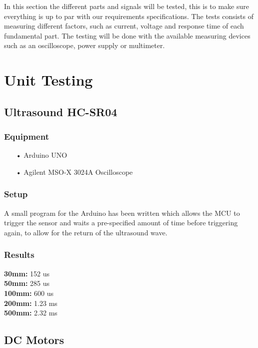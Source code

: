 In this section the different parts and signals will be tested, this is to make sure everything is up to par with our requirements specifications. The tests consists of measuring different factors, such as current, voltage and response time of each fundamental part. The testing will be done with the available measuring devices such as an oscilloscope, power supply or multimeter.


\section{Unit Testing}


\subsection{Ultrasound HC-SR04}


\subsubsection{Equipment}
\begin{enumerate}
    \item[•]Arduino UNO
    \item[•]Agilent MSO-X 3024A Oscilloscope    
\end{enumerate}

\subsubsection{Setup}
A small program for the Arduino has been written which allows the MCU to trigger the sensor and waits a pre-specified amount of time before triggering again, to allow for the return of the ultrasound wave. 

\subsubsection{Results}
\textbf{30mm:}  152 us\\
\textbf{50mm:}  285 us\\
\textbf{100mm:} 600 us\\
\textbf{200mm:} 1.23 ms\\
\textbf{500mm:} 2.32 ms\\

\subsection{DC Motors}

